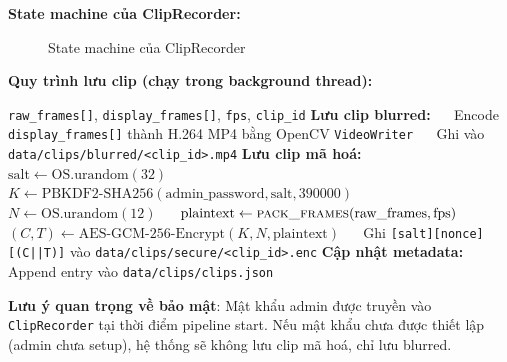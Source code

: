 \medskip
\textbf{State machine của ClipRecorder:}

\begin{figure}[H]
\centering
{}
\caption{State machine của ClipRecorder}
\label{fig:statemachine}
\end{figure}

\medskip
\textbf{Quy trình lưu clip (chạy trong background thread):}

\begin{algorithm}[H]
\caption{Lưu clip kép (blurred + encrypted)}
\begin{algorithmic}[1]
\Require \texttt{raw\_frames[]}, \texttt{display\_frames[]}, \texttt{fps}, \texttt{clip\_id}
\State \textbf{Lưu clip blurred:}
\State $\quad$ Encode \texttt{display\_frames[]} thành H.264 MP4 bằng OpenCV \texttt{VideoWriter}
\State $\quad$ Ghi vào \texttt{data/clips/blurred/<clip\_id>.mp4}
\State \textbf{Lưu clip mã hoá:}
\State $\quad$ $\text{salt} \leftarrow \text{OS.urandom}(32)$
\State $\quad$ $K \leftarrow \text{PBKDF2-SHA256}(\text{admin\_password}, \text{salt}, 390000)$
\State $\quad$ $N \leftarrow \text{OS.urandom}(12)$
\State $\quad$ $\text{plaintext} \leftarrow \textsc{pack\_frames}(\text{raw\_frames}, \text{fps})$
\State $\quad$ $(C, T) \leftarrow \text{AES-GCM-256-Encrypt}(K, N, \text{plaintext})$
\State $\quad$ Ghi \texttt{[salt][nonce][(C||T)]} vào \texttt{data/clips/secure/<clip\_id>.enc}
\State \textbf{Cập nhật metadata:}
\State $\quad$ Append entry vào \texttt{data/clips/clips.json}
\end{algorithmic}
\end{algorithm}

\medskip
\textbf{Lưu ý quan trọng về bảo mật}: Mật khẩu admin được truyền vào \texttt{ClipRecorder} tại thời điểm pipeline start. Nếu mật khẩu chưa được thiết lập (admin chưa setup), hệ thống sẽ không lưu clip mã hoá, chỉ lưu blurred.

